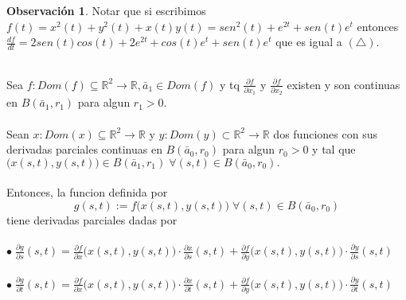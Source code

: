 \documentclass{article}
\theoremstyle{definition}
\theoremstyle{definition}
\newtheorem*{obs}{Observación}
\theoremstyle{remark}
\newcommand\bl{$\bullet\;$}
\begin{document}
\begin{obs}
  Notar que si escribimos \mbox{$f(t)=x^2(t)+y^2(t)+x(t)y(t)=sen^2(t)+e^{2t}+sen(t)e^t$} entonces $\frac{df}{dt}=2sen(t)cos(t)+2e^{2t}+cos(t)e^t+sen(t)e^t$ que es igual a \textcolor{rojop2}{$(\triangle)$}. 
\end{obs}\pagebreak
\begin{teo}\;\\
Sea $f: Dom(f) \subseteq \mathbb{R}^2 \to \mathbb{R}, \bar{a}_1 \in Dom(f)$ y tq $\frac{\partial f}{\partial x_1}$ y $\frac{\partial f}{\partial x_2}$ existen y son continuas en $B(\bar{a}_1,r_1)$ para algun $r_1>0$. \\\\Sean $ x : Dom(x) \subseteq \mathbb{R}^2 \to \mathbb{R}$ y $y : Dom(y) \subset \mathbb{R}^2 \to \mathbb{R}$ dos funciones con sus derivadas parciales continuas en $B(\bar{a}_0,r_0)$ para algun $r_0>0$ y tal que $\big(x(s,t),y(s,t)\big) \in B(\bar{a}_1,r_1) \; \forall (s,t) \in B(\bar{a}_0,r_0).$ \\\\ Entonces, la funcion definida por $$ g(s,t):=f\big(x(s,t),y(s,t)\big) \; \forall (s,t) \in B(\bar{a}_0,r_0)$$ tiene derivadas parciales dadas por \\\\ 
\bl $\frac{\partial g}{\partial s}(s,t)=\frac{\partial f}{\partial x}\big(x(s,t),y(s,t)\big)\cdot \frac{\partial x}{\partial s}(s,t)+\frac{\partial f}{\partial y}\big(x(s,t),y(s,t)\big)\cdot\frac{\partial y}{\partial s}(s,t)$ \\\\
\bl $\frac{\partial g}{\partial t}(s,t)=\frac{\partial f}{\partial x}\big(x(s,t),y(s,t)\big)\cdot \frac{\partial x}{\partial t}(s,t)+\frac{\partial f}{\partial y}\big(x(s,t),y(s,t)\big)\cdot\frac{\partial y}{\partial t}(s,t)$
\end{teo}
\begin{figure}[h]
\centering
\def\svgwidth{1\textwidth}
\makebox[\textwidth]{
}
\end{figure} \pagebreak
\end{document}
